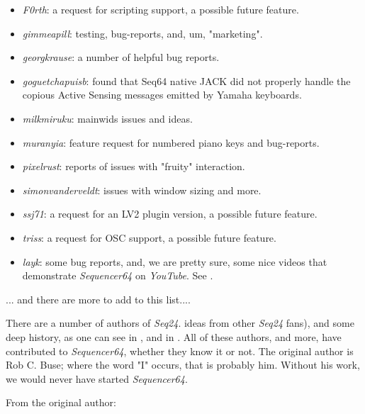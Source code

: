    \begin{itemize}
      \item \textsl{F0rth}:
         a request for scripting support, a possible future feature.
      \item \textsl{gimmeapill}:
         testing, bug-reports, and, um, "marketing".
      \item \textsl{georgkrause}:
         a number of helpful bug reports.
      \item \textsl{goguetchapuisb}:
         found that Seq64 native JACK did not properly handle the copious
         Active Sensing messages emitted by Yamaha keyboards.
      \item \textsl{milkmiruku}:
         mainwids issues and ideas.
      \item \textsl{muranyia}:
         feature request for numbered piano keys and bug-reports.
      \item \textsl{pixelrust}:
         reports of issues with "fruity" interaction.
      \item \textsl{simonvanderveldt}:
         issues with window sizing and more.
      \item \textsl{ssj71}:
         a request for an LV2 plugin version, a possible future feature.
      \item \textsl{triss}:
         a request for OSC support, a possible future feature.
      \item \textsl{layk}:
         some bug reports, and, we are pretty sure, some nice videos that
         demonstrate \textsl{Sequencer64} on \textsl{YouTube}.  See
         \cite{layk}.
         
   \end{itemize}

   ... and there are more to add to this list....

   There are a number of authors of \textsl{Seq24}.
   ideas from other \textsl{Seq24} fans),
   and some deep history,
   as one can see in ,
   and in .
   All of these authors, and more, have contributed to \textsl{Sequencer64},
   whether they know it or not.
   The original author is Rob C. Buse; where the word "I" occurs, that is
   probably him.  Without his work, we would never have started
   \textsl{Sequencer64}.

   From the original author:

